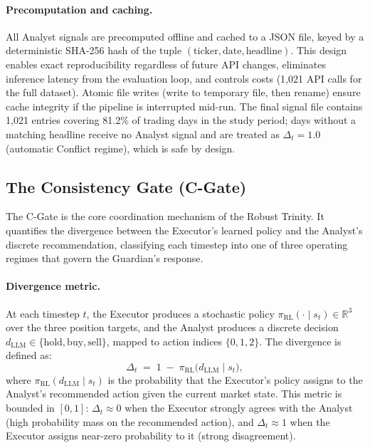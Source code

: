\paragraph{Precomputation and caching.}
All Analyst signals are precomputed offline and cached to a JSON file,
keyed by a deterministic SHA-256 hash of the tuple
$(\text{ticker}, \text{date}, \text{headline})$. This design enables
exact reproducibility regardless of future API changes, eliminates
inference latency from the evaluation loop, and controls costs (1{,}021
API calls for the full dataset). Atomic file writes (write to temporary
file, then rename) ensure cache integrity if the pipeline is interrupted
mid-run. The final signal file contains 1{,}021 entries covering 81.2\%
of trading days in the study period; days without a matching headline
receive no Analyst signal and are treated as $\Delta_t = 1.0$ (automatic
Conflict regime), which is safe by design.

\subsection{The Consistency Gate (C-Gate)}
\label{sec:cgate}

The C-Gate is the core coordination mechanism of the Robust
Trinity. It quantifies the divergence between the Executor's learned policy
and the Analyst's discrete recommendation, classifying each timestep into
one of three operating regimes that govern the Guardian's response.

\paragraph{Divergence metric.}
At each timestep $t$, the Executor produces a stochastic policy
$\pi_{\mathrm{RL}}(\cdot \mid s_t) \in \mathbb{R}^3$ over the three
position targets, and the Analyst produces a discrete decision
$d_{\mathrm{LLM}} \in \{\text{hold}, \text{buy}, \text{sell}\}$, mapped to
action indices $\{0, 1, 2\}$. The divergence is defined as:
\begin{equation}
\label{eq:delta}
  \Delta_t \;=\; 1 \;-\; \pi_{\mathrm{RL}}\!\bigl(d_{\mathrm{LLM}} \mid s_t\bigr),
\end{equation}
where $\pi_{\mathrm{RL}}(d_{\mathrm{LLM}} \mid s_t)$ is the probability
that the Executor's policy assigns to the Analyst's recommended action
given the current market state. This metric is bounded in $[0, 1]$:
$\Delta_t \approx 0$ when the Executor strongly agrees with the Analyst
(high probability mass on the recommended action), and
$\Delta_t \approx 1$ when the Executor assigns near-zero probability to
it (strong disagreement).

